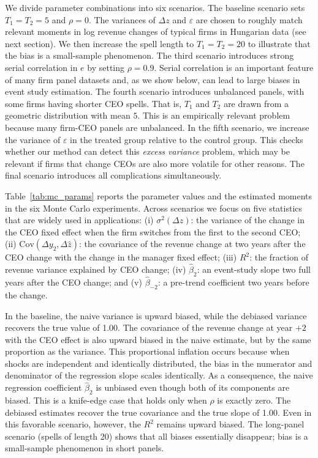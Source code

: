 \documentclass[11pt,a4paper]{article}
\begin{document}
We divide parameter combinations into six scenarios. The baseline scenario sets $T_1=T_2=5$ and $\rho=0$. The variances of $\Delta z$ and $\varepsilon$ are chosen to roughly match relevant moments in log revenue changes of typical firms in Hungarian data (see next section). We then increase the spell length to $T_1=T_2=20$ to illustrate that the bias is a small-sample phenomenon. The third scenario introduces strong serial correlation in $e$ by setting $\rho=0.9$. Serial correlation is an important feature of many firm panel datasets \citep{Olley1996-wy,Syverson2011-ti} and, as we show below, can lead to large biases in event study estimation. The fourth scenario introduces unbalanced panels, with some firms having shorter CEO spells. That is, $T_1$ and $T_2$ are drawn from a geometric distribution with mean $5$. This is an empirically relevant problem because many firm-CEO panels are unbalanced. In the fifth scenario, we increase the variance of $\varepsilon$ in the treated group relative to the control group. This checks whether our method can detect this \emph{excess variance} problem, which may be relevant if firms that change CEOs are also more volatile for other reasons. The final scenario introduces all complications simultaneously.

Table~\ref{tab:mc_params} reports the parameter values and the estimated moments in the six Monte Carlo experiments. Across scenarios we focus on five statistics that are widely used in applications: (i) $\sigma^2(\Delta \hat z)$: the variance of the change in the CEO fixed effect when the firm switches from the first to the second CEO; (ii) $ \mathrm{Cov}(\Delta y_2, \Delta \hat z)$: the covariance of the revenue change at two years after the CEO change with the change in the manager fixed effect; (iii) $ R^2$: the fraction of revenue variance explained by CEO change; (iv) $\hat \beta_2$: an event-study slope two full years after the CEO change; and (v)  $\hat \beta_{-2}$: a pre-trend coefficient two years before the change.

In the baseline, the naive variance is upward biased, while the debiased variance recovers the true value of 1.00. The covariance of the revenue change at year $+2$ with the CEO effect is also upward biased in the naive estimate, but by the same proportion as the variance. This proportional inflation occurs because when shocks are independent and identically distributed, the bias in the numerator and denominator of the regression slope scales identically. As a consequence, the naive regression coefficient $\hat\beta_2$ is unbiased even though both of its components are biased. This is a knife-edge case that holds only when $\rho$ is exactly zero. The debiased estimates recover the true covariance and the true slope of 1.00. Even in this favorable scenario, however, the $R^2$ remains upward biased. The long-panel scenario (spells of length 20) shows that all biases essentially disappear; bias is a small-sample phenomenon in short panels.
\end{document}
